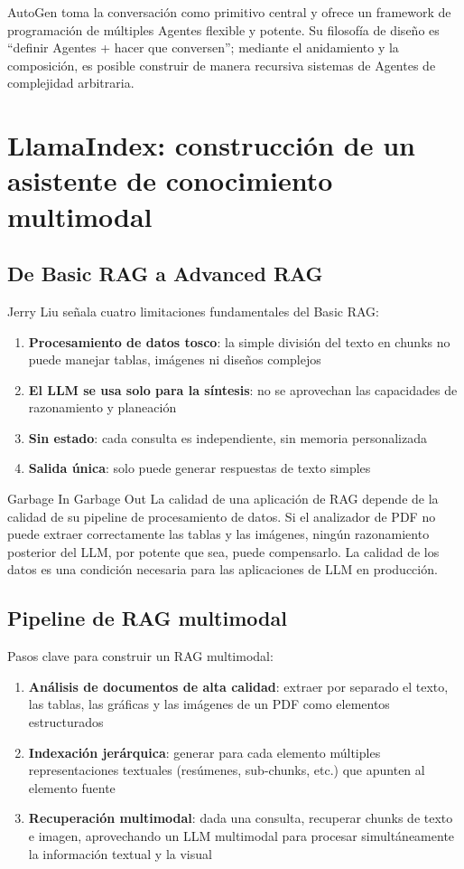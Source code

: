 \documentclass[a4paper]{article}
\begin{document}
AutoGen toma la conversación como primitivo central y ofrece un framework de programación de múltiples Agentes flexible y potente. Su filosofía de diseño es ``definir Agentes + hacer que conversen''; mediante el anidamiento y la composición, es posible construir de manera recursiva sistemas de Agentes de complejidad arbitraria.

\section{LlamaIndex: construcción de un asistente de conocimiento multimodal}

\subsection{De Basic RAG a Advanced RAG}

Jerry Liu señala cuatro limitaciones fundamentales del Basic RAG:
\begin{enumerate}
    \item \textbf{Procesamiento de datos tosco}: la simple división del texto en chunks no puede manejar tablas, imágenes ni diseños complejos
    \item \textbf{El LLM se usa solo para la síntesis}: no se aprovechan las capacidades de razonamiento y planeación
    \item \textbf{Sin estado}: cada consulta es independiente, sin memoria personalizada
    \item \textbf{Salida única}: solo puede generar respuestas de texto simples
\end{enumerate}

\begin{warningbox}{Garbage In Garbage Out}
La calidad de una aplicación de RAG depende de la calidad de su pipeline de procesamiento de datos. Si el analizador de PDF no puede extraer correctamente las tablas y las imágenes, ningún razonamiento posterior del LLM, por potente que sea, puede compensarlo. La calidad de los datos es una condición necesaria para las aplicaciones de LLM en producción.
\end{warningbox}

\subsection{Pipeline de RAG multimodal}

Pasos clave para construir un RAG multimodal:

\begin{enumerate}
    \item \textbf{Análisis de documentos de alta calidad}: extraer por separado el texto, las tablas, las gráficas y las imágenes de un PDF como elementos estructurados
    \item \textbf{Indexación jerárquica}: generar para cada elemento múltiples representaciones textuales (resúmenes, sub-chunks, etc.) que apunten al elemento fuente
    \item \textbf{Recuperación multimodal}: dada una consulta, recuperar chunks de texto e imagen, aprovechando un LLM multimodal para procesar simultáneamente la información textual y la visual
\end{enumerate}
\end{document}
